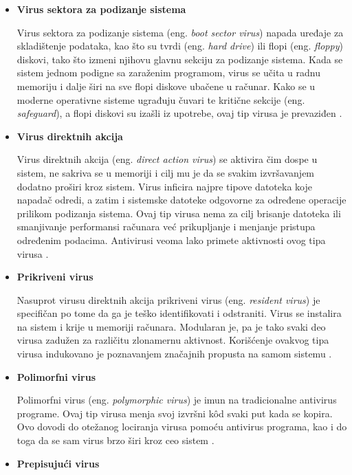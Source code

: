 \documentclass[a4paper]{article}
\begin{document}
\begin{itemize}
\item \textbf{Virus sektora za podizanje sistema}

Virus sektora za podizanje sistema (eng. \textit{boot sector virus}) napada uređaje za skladištenje podataka, kao što su tvrdi (eng. \textit{hard drive}) ili flopi (eng. \textit{floppy}) diskovi, tako što izmeni njihovu glavnu sekciju za podizanje sistema. Kada se sistem jednom podigne sa zaraženim programom, virus se učita u radnu memoriju i dalje širi na sve flopi diskove ubačene u računar. Kako se u moderne operativne sisteme ugrađuju čuvari te kritične sekcije (eng. \textit{safeguard}), a flopi diskovi su izašli iz upotrebe, ovaj tip virusa je prevaziđen \cite{viruses_and_worms, computer_virus}.


\item \textbf{Virus direktnih akcija}

Virus direktnih akcija (eng. \textit{direct action virus}) se aktivira čim dospe u sistem, ne sakriva se u memoriji i cilj mu je da se svakim izvršavanjem dodatno proširi kroz sistem. Virus inficira najpre tipove datoteka koje napadač odredi, a zatim i sistemske datoteke odgovorne za određene operacije prilikom podizanja sistema. Ovaj tip virusa nema za cilj brisanje datoteka ili smanjivanje performansi računara već prikupljanje i menjanje pristupa određenim podacima. Antivirusi veoma lako primete aktivnosti ovog tipa virusa \cite{directaction}.


\item \textbf{Prikriveni virus}

Nasuprot virusu direktnih akcija prikriveni virus (eng. \textit{resident virus}) je specifičan po tome da ga je teško identifikovati i odstraniti. Virus se instalira na sistem i krije u memoriji računara. Modularan je, pa je tako svaki deo virusa zadužen za različitu zlonamernu aktivnost. Korišćenje ovakvog tipa virusa indukovano je poznavanjem značajnih propusta na samom sistemu \cite{computer_virus}.

\item \textbf{Polimorfni virus}

Polimorfni virus (eng. \textit{polymorphic virus}) je imun na tradicionalne antivirus programe. Ovaj tip virusa menja svoj izvršni kôd svaki put kada se kopira. Ovo dovodi do otežanog lociranja virusa pomoću antivirus programa, kao i do toga da se sam virus brzo širi kroz ceo sistem \cite{computer_virus}.

\item \textbf{Prepisujući virus}


\end{itemize}
\end{document}
